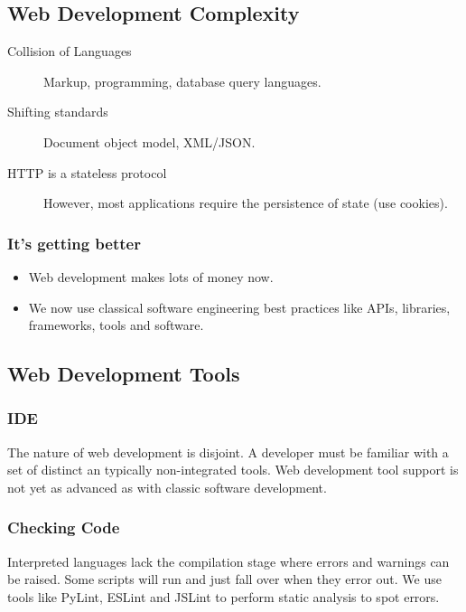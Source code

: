 \subsection{Web Development Complexity}\label{sub:web_development_complexity}

\begin{description}
	\item[Collision of Languages] Markup, programming, database query languages.
	\item[Shifting standards] Document object model, XML/JSON.
	\item[HTTP is a stateless protocol] However, most applications require the persistence of state (use cookies).
\end{description}

\subsubsection{It's getting better}\label{ssub:it_s_getting_better}

\begin{itemize}
	\item Web development makes lots of money now.
	\item We now use classical software engineering best practices like APIs, libraries, frameworks, tools and software.
\end{itemize}

\subsection{Web Development Tools}\label{sub:web_development_tools}

\subsubsection{IDE}\label{ssub:ide}

The nature of web development is disjoint.
A developer must be familiar with a set of distinct an typically non-integrated tools.
Web development tool support is not yet as advanced as with classic software development.

\subsubsection{Checking Code}\label{ssub:checking_code}

Interpreted languages lack the compilation stage where errors and warnings can be raised.
Some scripts will run and just fall over when they error out.
We use tools like PyLint, ESLint and JSLint to perform static analysis to spot errors.


